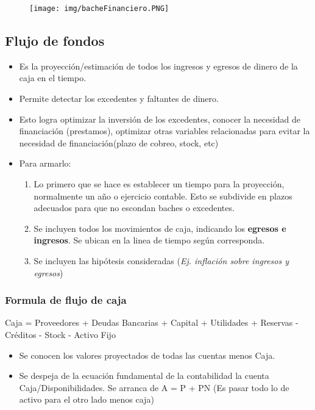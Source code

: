 \documentclass[titlepage,a4paper]{article}
\begin{document}
\begin{figure}[!htb]
    \centering
    \texttt{[image: img/bacheFinanciero.PNG]}
\end{figure}

\subsection{Flujo de fondos}
\begin{itemize}
\item Es la proyección/estimación de todos los ingresos y egresos de dinero de la caja en el tiempo.
\item Permite detectar los excedentes y faltantes de dinero.
\item Esto logra optimizar la inversión de los excedentes, conocer la necesidad de financiación (prestamos), optimizar otras variables relacionadas para evitar la necesidad de financiación(plazo de  cobreo, stock, etc)
\item Para armarlo:
\begin{enumerate}
    \item Lo primero que se hace es establecer un tiempo para la proyección, normalmente un año o ejercicio contable. Esto se subdivide en plazos adecuados para que no escondan baches o excedentes.
    \item Se incluyen todos los movimientos de caja, indicando los \textbf{egresos e ingresos}. Se ubican en la linea de tiempo según corresponda.
    \item Se incluyen las hipótesis consideradas (\textit{Ej. inflación sobre ingresos y egresos})
\end{enumerate}
\end{itemize}

\subsubsection*{Formula de flujo de caja}
Caja = Proveedores + Deudas Bancarias + Capital + Utilidades + Reservas - Créditos - Stock - Activo Fijo

\begin{itemize}
\item Se conocen los valores proyectados de todas las cuentas menos Caja.
\item Se despeja de la ecuación fundamental de la contabilidad la cuenta Caja/Disponibilidades. Se arranca de A = P + PN (Es pasar todo lo de activo para el otro lado menos caja)
\end{itemize}
\end{document}
